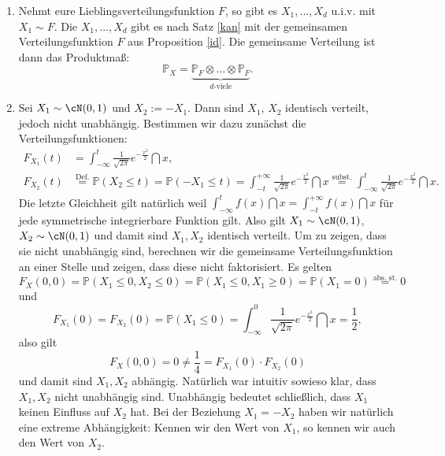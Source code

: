 \marginpar{\textcolor{red}{Vorlesung 21}}

\begin{beispiel}\abs
	\begin{enumerate}[label=(\roman*)]
		\item Nehmt eure Lieblingsverteilungsfunktion $F$, so gibt es $X_1,...,X_d$ u.i.v. mit $X_1 \sim F$. Die $X_1,...,X_d$ gibt es nach Satz \ref{kan} mit der gemeinsamen Verteilungsfunktion $F$ aus Proposition \ref{id}. Die gemeinsame Verteilung ist dann das Produktma\ss{}:
		 \[ \mathbb{P}_X = \underbrace{\mathbb{P}_F \otimes ... \otimes \mathbb{P}_F}_{d\text{-viele}}. \]
		\item Sei $X_1 \sim \cN(0,1)$ und $X_2 := -X_1$. Dann sind $X_1$, $X_2$ identisch verteilt, jedoch nicht unabh\"angig. Bestimmen wir dazu zun\"achst die Verteilungsfunktionen:
		\begin{align*}
			F_{X_1}(t) &= \int_{-\infty}^{t} \frac{1}{\sqrt{2 \pi}} e^{-\frac{x^2}{2}} \dint x,\\
			F_{X_2}(t)& \overset{\text{Def.}}{=} \mathbb{P}(X_2 \leq t) = \mathbb{P}(-X_1 \leq t) = \int_{-t}^{+\infty} \frac{1}{\sqrt{2 \pi}} e^{-\frac{x^2}{2}} \dint x 
			 \overset{\text{subst.}}{=} \int_{-\infty}^{t} \frac{1}{\sqrt{2 \pi}} e^{-\frac{x^2}{2}} \dint x.
		\end{align*}
		Die letzte Gleichheit gilt nat\"urlich weil $\int_{-\infty}^t f(x)\dint x=\int_{-t}^{+\infty} f(x)\dint x$ f\"ur jede symmetrische integrierbare Funktion gilt.
		Also gilt $X_1 \sim \cN(0,1)$, $X_2 \sim \cN(0,1)$ und damit sind $X_1, X_2$ identisch verteilt. Um zu zeigen, dass sie nicht unabh\"angig sind, berechnen wir die gemeinsame Verteilungsfunktion an einer Stelle und zeigen, dass diese nicht faktorisiert. Es gelten
		\[ F_X(0,0) = \mathbb{P}(X_1 \leq 0, X_2 \leq 0) = \mathbb{P}(X_1 \leq 0, X_1 \geq 0) = \mathbb{P}(X_1 = 0) \overset{\text{abs. st.}}{=} 0 \] und
		\[ F_{X_1}(0) = F_{X_2}(0) = \mathbb{P}(X_1 \leq 0) = \int_{-\infty}^{0} \frac{1}{\sqrt{2 \pi}} e^{-\frac{x^2}{2}} \dint x = \frac{1}{2}, \]
		also gilt $$ F_X(0,0) = 0 \neq \frac{1}{4} = F_{X_1}(0) \cdot F_{X_2}(0)$$ und damit sind $X_1,X_2$ abhängig. Nat\"urlich war intuitiv sowieso klar, dass $X_1, X_2$ nicht unabh\"angig sind. Unabh\"angig bedeutet schlie\ss lich, dass $X_1$ keinen Einfluss auf $X_2$ hat. Bei der Beziehung $X_1=-X_2$ haben wir nat\"urlich eine extreme Abh\"angigkeit: Kennen wir den Wert von $X_1$, so kennen wir auch den Wert von $X_2$.		
	\end{enumerate}
\end{beispiel}

